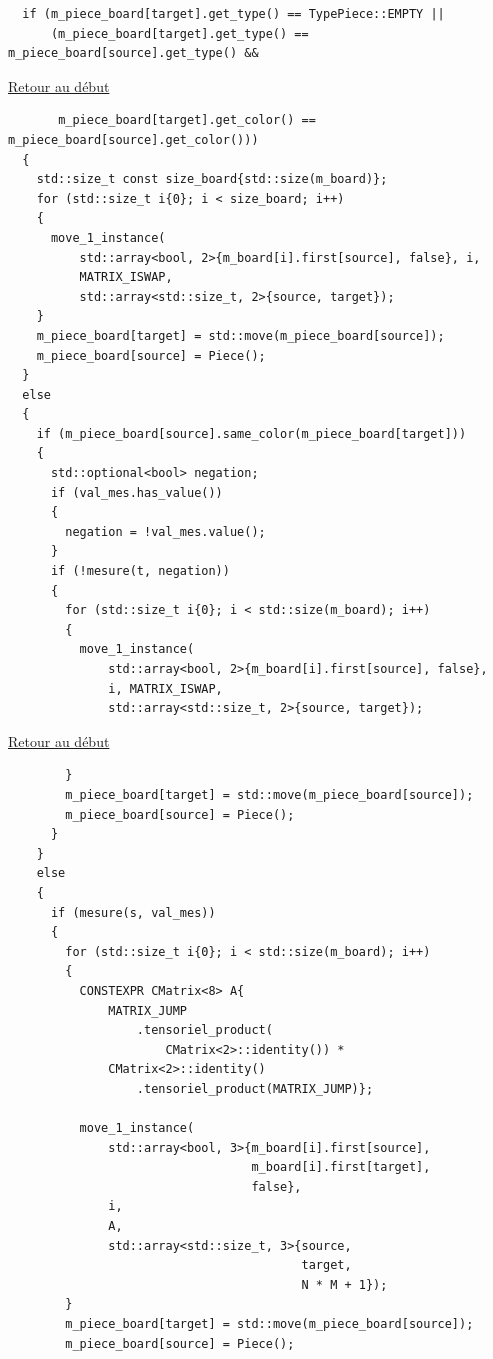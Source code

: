 {\begin{frame}[fragile]
\begin{verbatim}
  if (m_piece_board[target].get_type() == TypePiece::EMPTY ||
      (m_piece_board[target].get_type() == m_piece_board[source].get_type() &&
\end{verbatim}
\end{frame}

\begin{frame}[fragile]
\hyperlink{conclusion}{Retour au début}\newline
\begin{verbatim}
       m_piece_board[target].get_color() == m_piece_board[source].get_color()))
  {
    std::size_t const size_board{std::size(m_board)};
    for (std::size_t i{0}; i < size_board; i++)
    {
      move_1_instance(
          std::array<bool, 2>{m_board[i].first[source], false}, i,
          MATRIX_ISWAP,
          std::array<std::size_t, 2>{source, target});
    }
    m_piece_board[target] = std::move(m_piece_board[source]);
    m_piece_board[source] = Piece();
  }
  else
  {
    if (m_piece_board[source].same_color(m_piece_board[target]))
    {
      std::optional<bool> negation;
      if (val_mes.has_value())
      {
        negation = !val_mes.value();
      }
      if (!mesure(t, negation))
      {
        for (std::size_t i{0}; i < std::size(m_board); i++)
        {
          move_1_instance(
              std::array<bool, 2>{m_board[i].first[source], false},
              i, MATRIX_ISWAP,
              std::array<std::size_t, 2>{source, target});
\end{verbatim}
\end{frame}

\begin{frame}[fragile]
\hyperlink{conclusion}{Retour au début}\newline
\begin{verbatim}
        }
        m_piece_board[target] = std::move(m_piece_board[source]);
        m_piece_board[source] = Piece();
      }
    }
    else
    {
      if (mesure(s, val_mes))
      {
        for (std::size_t i{0}; i < std::size(m_board); i++)
        {
          CONSTEXPR CMatrix<8> A{
              MATRIX_JUMP
                  .tensoriel_product(
                      CMatrix<2>::identity()) *
              CMatrix<2>::identity()
                  .tensoriel_product(MATRIX_JUMP)};

          move_1_instance(
              std::array<bool, 3>{m_board[i].first[source],
                                  m_board[i].first[target],
                                  false},
              i,
              A,
              std::array<std::size_t, 3>{source,
                                         target,
                                         N * M + 1});
        }
        m_piece_board[target] = std::move(m_piece_board[source]);
        m_piece_board[source] = Piece();
\end{verbatim}
\end{frame}

}
